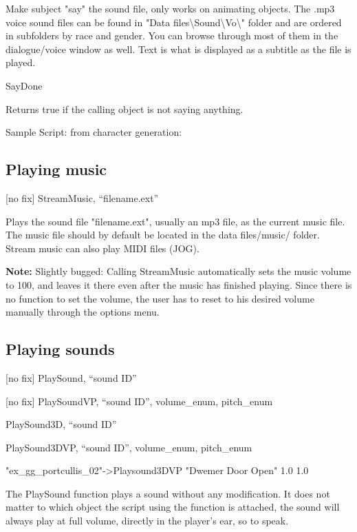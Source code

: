 Make subject "say" the sound file, only works on animating objects. The
.mp3 voice sound files can be found in "Data
files\textbackslash Sound\textbackslash Vo\textbackslash" folder and are
ordered in subfolders by race and gender. You can browse through most of
them in the dialogue/voice window as well. Text is what is displayed as
a subtitle as the file is played.

SayDone

Returns true if the calling object is not saying anything.

Sample Script: from character generation:



\hypertarget{playing-music}{%
\subsection{Playing music}\label{playing-music}}

{[}no fix{]} StreamMusic, ``filename.ext''

Plays the sound file "filename.ext", usually an mp3 file, as the current
music file. The music file should by default be located in the data
files/music/ folder. Stream music can also play MIDI files (JOG).

\textbf{Note:} Slightly bugged: Calling StreamMusic automatically sets
the music volume to 100, and leaves it there even after the music has
finished playing. Since there is no function to set the volume, the user
has to reset to his desired volume manually through the options menu.

\hypertarget{playing-sounds}{%
\subsection{Playing sounds}\label{playing-sounds}}

{[}no fix{]} PlaySound, ``sound ID''

{[}no fix{]} PlaySoundVP, ``sound ID'', volume\_enum, pitch\_enum

PlaySound3D, ``sound ID''

PlaySound3DVP, ``sound ID'', volume\_enum, pitch\_enum

"ex\_gg\_portcullis\_02"-\textgreater Playsound3DVP "Dwemer Door Open"
1.0 1.0

The PlaySound function plays a sound without any modification. It does
not matter to which object the script using the function is attached,
the sound will always play at full volume, directly in the player's ear,
so to speak.

